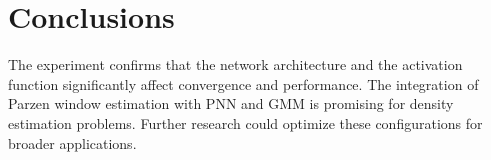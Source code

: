\documentclass{article}
\begin{document}
\section{Conclusions}
The experiment confirms that the network architecture and the activation function significantly affect convergence and performance. The integration of Parzen window estimation with PNN and GMM is promising for density estimation problems. Further research could optimize these configurations for broader applications.
\end{document}
